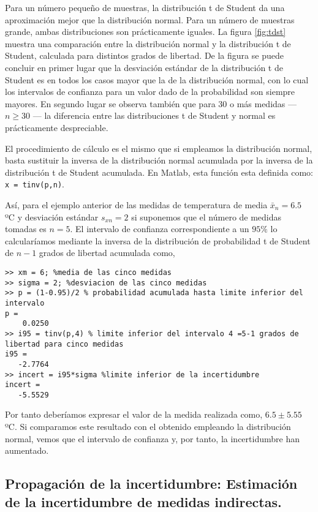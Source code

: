 Para un número pequeño de muestras, la distribución t de Student da una aproximación mejor que la distribución normal. Para un número de muestras grande, ambas distribuciones son prácticamente iguales.  La figura \ref{fig:tdst} muestra una comparación entre la distribución normal y la distribución t de Student, calculada para distintos grados de libertad. De la figura se puede concluir en primer lugar que la desviación estándar de la distribución t de Student es en todos los casos mayor que la de la distribución normal, con lo cual los intervalos de confianza para un valor dado de la probabilidad son siempre mayores. En segundo lugar se observa también que para 30 o más medidas --- $n\geqslant 30$ --- la diferencia entre las distribuciones t de Student y normal es prácticamente despreciable.

El procedimiento de cálculo es el mismo que si empleamos la distribución normal, basta sustituir la inversa de la distribución normal acumulada por la inversa de la distribución t de Student acumulada. En Matlab, esta función esta definida como: \texttt{x = tinv(p,n)}. 

Así, para el ejemplo anterior de las medidas de temperatura de media  $\bar{x}_n=6.5$ ºC y  desviación estándar $s_{xn}=2$  si suponemos que el número de medidas tomadas es $n=5$. El intervalo de confianza correspondiente a un $95\%$  lo calcularíamos mediante la inversa de la distribución de probabilidad t de Student de $n-1$ grados de libertad acumulada como,

\begin{verbatim}
>> xm = 6; %media de las cinco medidas
>> sigma = 2; %desviacion de las cinco medidas
>> p = (1-0.95)/2 % probabilidad acumulada hasta limite inferior del intervalo
p =
    0.0250
>> i95 = tinv(p,4) % limite inferior del intervalo 4 =5-1 grados de libertad para cinco medidas
i95 =
   -2.7764
>> incert = i95*sigma %limite inferior de la incertidumbre
incert =
   -5.5529
\end{verbatim}

Por tanto deberíamos expresar el valor de la medida realizada como, $6.5\pm 5.55$ ºC. Si comparamos este resultado con el obtenido empleando la distribución normal, vemos que el intervalo de confianza y, por tanto, la incertidumbre han aumentado.

\subsection{Propagación de la incertidumbre: Estimación de la incertidumbre de medidas indirectas.}

